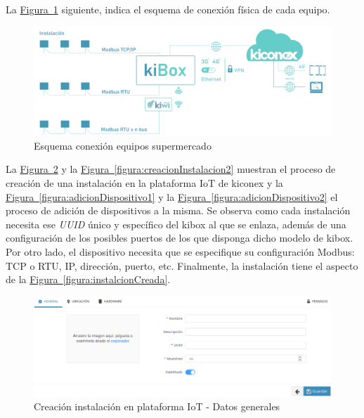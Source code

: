La \hyperref[figura:esquemaConexion]{Figura~\ref{figura:esquemaConexion}} siguiente, indica el esquema de conexión física de cada equipo.

\begin{figure}[H]
  \centering
  \includegraphics[width=\textwidth, keepaspectratio]{img/esquemaConexion}
  \caption{Esquema conexión equipos supermercado}
  \label{figura:esquemaConexion}
\end{figure}

La \hyperref[figura:creacionInstalacion1]{Figura~\ref{figura:creacionInstalacion1}} y la \hyperref[figura:creacionInstalacion2]{Figura~\ref{figura:creacionInstalacion2}} muestran el proceso de creación de una instalación en la plataforma IoT de kiconex y la \hyperref[figura:adicionDispositivo1]{Figura~\ref{figura:adicionDispositivo1}} y la \hyperref[figura:adicionDispositivo2]{Figura~\ref{figura:adicionDispositivo2}} el proceso de adición de dispositivos a la misma. Se observa como cada instalación necesita ese \textit{UUID} único y específico del kibox al que se enlaza, además de una configuración de los posibles puertos de los que disponga dicho modelo de kibox. Por otro lado, el dispositivo necesita que se especifique su configuración Modbus: TCP o RTU, IP, dirección, puerto, etc. Finalmente, la instalación tiene el aspecto de la \hyperref[figura:instalcionCreada]{Figura~\ref{figura:instalcionCreada}}.



\vspace*{\fill}

\begin{figure}[H]
  \centering
  \includegraphics[width=\textwidth, keepaspectratio]{img/creacionInstalacionGeneral}
  \caption{Creación instalación en plataforma IoT - Datos generales}
  \label{figura:creacionInstalacion1}
\end{figure}

